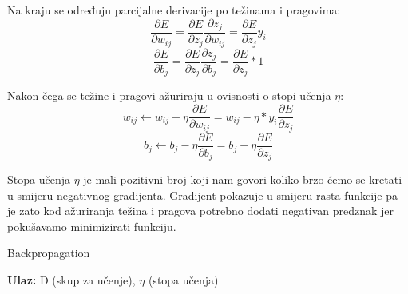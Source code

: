 \documentclass[times, utf8, zavrsni, numeric]{fer}
\begin{document}
Na kraju se određuju parcijalne derivacije po težinama i pragovima:
\begin{equation}\label{eq:der-w}
\dfrac{\partial E}{\partial w_{ij}} = \dfrac{\partial E}{\partial z_j}\dfrac{\partial z_j}{\partial w_{ij}} = \dfrac{\partial E}{\partial z_j}y_i
\end{equation}
\begin{equation}\label{eq:der-b}
\dfrac{\partial E}{\partial b_j} = \dfrac{\partial E}{\partial z_j}\dfrac{\partial z_j}{\partial b_j} = \dfrac{\partial E}{\partial z_j}*1
\end{equation}

Nakon čega se težine i pragovi ažuriraju u ovisnosti o stopi učenja $\eta$:
\begin{equation}\label{eq:azuriraj-w}
w_{ij} \leftarrow w_{ij} - \eta\dfrac{\partial E}{\partial w_{ij}} = w_{ij} - \eta * y_i  \dfrac{\partial E}{\partial z_j}
\end{equation}
\begin{equation}\label{eq:azuriraj-b}
b_{j} \leftarrow b_{j} - \eta\dfrac{\partial E}{\partial b_{j}} = b_{j} - \eta \dfrac{\partial E}{\partial z_j}
\end{equation}

Stopa učenja $\eta$ je mali pozitivni broj koji nam govori koliko brzo ćemo se kretati u smijeru negativnog gradijenta. Gradijent pokazuje u smijeru rasta funkcije pa je zato kod ažuriranja težina i pragova potrebno dodati negativan predznak jer pokušavamo minimizirati funkciju.

\begin{algorithm}
\caption{Backpropagation}
\label{alg:backpropagation}
\begin{algorithmic}
\STATE \textbf{Ulaz:} D (skup za učenje), $\eta$ (stopa učenja)
\ENDFOR
\ENDFOR
\ENDWHILE
\end{algorithmic}
\end{algorithm}
\end{document}
